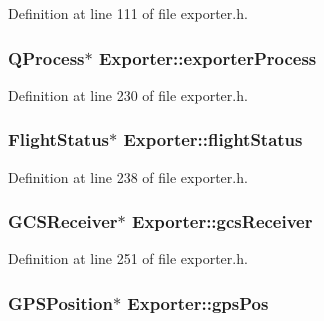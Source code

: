 \-Definition at line 111 of file exporter.\-h.

\hypertarget{group___mo_cap_plugin_ga3e0f59d7efdaba4ae56afc474e929a17}{
\subsubsection[{exporter\-Process}]{\setlength{\rightskip}{0pt plus 5cm}\-Q\-Process$\ast$ {\bf \-Exporter\-::exporter\-Process}}}\label{group___mo_cap_plugin_ga3e0f59d7efdaba4ae56afc474e929a17}


\-Definition at line 230 of file exporter.\-h.

\hypertarget{group___mo_cap_plugin_ga63bef489a0fb9ccf02eadc577d487c10}{
\subsubsection[{flight\-Status}]{\setlength{\rightskip}{0pt plus 5cm}\-Flight\-Status$\ast$ {\bf \-Exporter\-::flight\-Status}}}\label{group___mo_cap_plugin_ga63bef489a0fb9ccf02eadc577d487c10}


\-Definition at line 238 of file exporter.\-h.

\hypertarget{group___mo_cap_plugin_ga49b2f0b0762b95f0da3f7c4a7330b941}{
\subsubsection[{gcs\-Receiver}]{\setlength{\rightskip}{0pt plus 5cm}\-G\-C\-S\-Receiver$\ast$ {\bf \-Exporter\-::gcs\-Receiver}}}\label{group___mo_cap_plugin_ga49b2f0b0762b95f0da3f7c4a7330b941}


\-Definition at line 251 of file exporter.\-h.

\hypertarget{group___mo_cap_plugin_gab8839ee3d842d22d5717905f7dea20cd}{
\subsubsection[{gps\-Pos}]{\setlength{\rightskip}{0pt plus 5cm}\-G\-P\-S\-Position$\ast$ {\bf \-Exporter\-::gps\-Pos}}}\label{group___mo_cap_plugin_gab8839ee3d842d22d5717905f7dea20cd}


